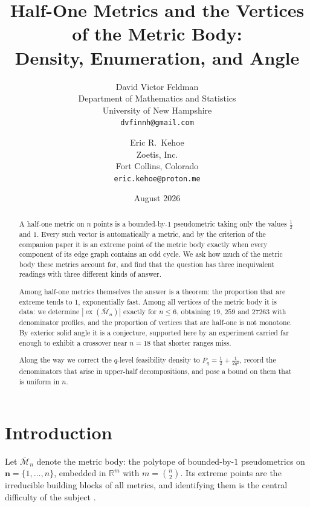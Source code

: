\documentclass[11pt]{article}
\title{\textbf{Half-One Metrics and the Vertices of the Metric Body:\\
Density, Enumeration, and Angle}}
\author{David Victor Feldman\\
\small Department of Mathematics and Statistics\\
\small University of New Hampshire\\
\small \texttt{dvfinnh@gmail.com}
\and
Eric R.\ Kehoe\\
\small Zoetis, Inc.\\
\small Fort Collins, Colorado\\
\small \texttt{eric.kehoe@proton.me}}
\date{August 2026}
\theoremstyle{definition}
\theoremstyle{remark}
\newcommand{\R}{\mathbb{R}}
\newcommand{\bM}{\bar{\mathcal{M}}}
\newcommand{\ex}{\operatorname{ex}}
\begin{document}
\maketitle
\let\thefootnote\relax{}

\begin{abstract}
A half-one metric on $n$ points is a bounded-by-$1$ pseudometric taking only the values
$\tfrac12$ and $1$. Every such vector is automatically a metric, and by the criterion of
the companion paper it is an extreme point of the metric body exactly when every component
of its edge graph contains an odd cycle. We ask how much of the metric body these metrics
account for, and find that the question has three inequivalent readings with three
different kinds of answer.

Among half-one metrics themselves the answer is a theorem: the proportion that are extreme
tends to $1$, exponentially fast. Among all vertices of the metric body it is data: we
determine $|\ex(\bM_n)|$ exactly for $n\leq6$, obtaining $19$, $259$ and $27263$ with
denominator profiles, and the proportion of vertices that are half-one is not monotone.
By exterior solid angle it is a conjecture, supported here by an experiment carried far
enough to exhibit a crossover near $n=18$ that shorter ranges miss.

Along the way we correct the $q$-level feasibility density to
$P_q=\tfrac12+\tfrac1{2q^2}$, record the denominators that arise in upper-half
decompositions, and pose a bound on them that is uniform in $n$.
\end{abstract}

\section{Introduction}
\label{sec:intro}

Let $\bM_n$ denote the metric body: the polytope of bounded-by-$1$ pseudometrics on
$\mathbf n=\{1,\ldots,n\}$, embedded in $\R^m$ with $m=\binom n2$. Its extreme points are
the irreducible building blocks of all metrics, and identifying them is the central
difficulty of the subject \cite{Avis80,Bandelt92,Deza97,Koolen00}.
\end{document}
